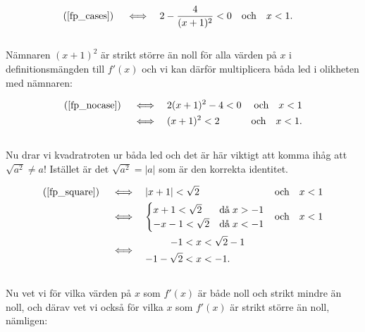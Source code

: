 \documentclass{article}
\begin{document}
\begin{align}
  \text{(\ref{fp_cases})} \quad \iff \quad & 2 - \frac{4}{(x+1)^{2}} < 0 \quad \text{och} \quad x < 1\text{.} \label{fp_nocase}
\end{align}
\\
Nämnaren $(x + 1)^{2}$ är strikt större än noll för alla värden på $x$ i definitionsmängden till $f'(x)$ och vi kan därför multiplicera båda led i olikheten med nämnaren:

\begin{align}
  \text{(\ref{fp_nocase})} \quad \iff \quad & 2(x + 1)^{2} - 4 < 0 & \text{och} \quad x < 1 \notag \\
  \iff \quad & (x + 1)^{2} < 2 & \text{och} \quad x < 1\text{.} \label{fp_square}
\end{align}
\\
Nu drar vi kvadratroten ur båda led och det är här viktigt att komma ihåg att $\sqrt{a^{2}} \neq a$! Istället är det $\sqrt{a^{2}} = |a|$ som är den korrekta identitet.

\begin{align*}
  \text{(\ref{fp_square})} \quad \iff \quad & |x + 1| < \sqrt{2} & \text{och} \quad x < 1 \\
  \iff \quad &
               \begin{aligned}
                 \begin{cases}
                   x + 1 < \sqrt{2} & \text{då} \; x > - 1 \\
                   -x -1 < \sqrt{2} & \text{då} \; x < - 1
                 \end{cases}
               \end{aligned}
  & \text{och} \quad x < 1\\
  \iff \quad &
              \begin{aligned}
                -1 &< x < \sqrt{2} - 1 \\
                -1 -\sqrt{2} &< x < - 1\text{.}
              \end{aligned}
\end{align*}
\\
Nu vet vi för vilka värden på $x$ som $f'(x)$ är både noll och strikt mindre än noll, och därav vet vi också för vilka $x$ som $f'(x)$ är strikt större än noll, nämligen:
\end{document}
